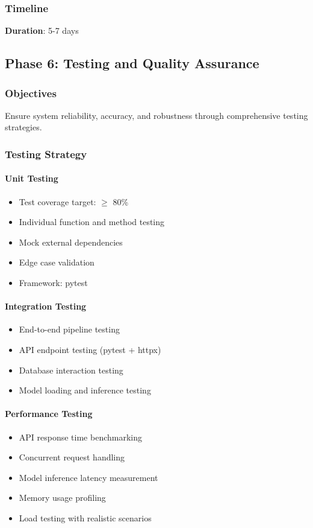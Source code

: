 \documentclass[12pt,a4paper]{article}
\begin{document}
\subsubsection{Timeline}
\textbf{Duration}: 5-7 days

\newpage

\subsection{Phase 6: Testing and Quality Assurance}

\subsubsection{Objectives}
Ensure system reliability, accuracy, and robustness through comprehensive testing strategies.

\subsubsection{Testing Strategy}

\paragraph{Unit Testing}
\begin{itemize}[leftmargin=*]
    \item Test coverage target: $\geq$ 80\%
    \item Individual function and method testing
    \item Mock external dependencies
    \item Edge case validation
    \item Framework: pytest
\end{itemize}

\paragraph{Integration Testing}
\begin{itemize}[leftmargin=*]
    \item End-to-end pipeline testing
    \item API endpoint testing (pytest + httpx)
    \item Database interaction testing
    \item Model loading and inference testing
\end{itemize}

\paragraph{Performance Testing}
\begin{itemize}[leftmargin=*]
    \item API response time benchmarking
    \item Concurrent request handling
    \item Model inference latency measurement
    \item Memory usage profiling
    \item Load testing with realistic scenarios
\end{itemize}
\end{document}
